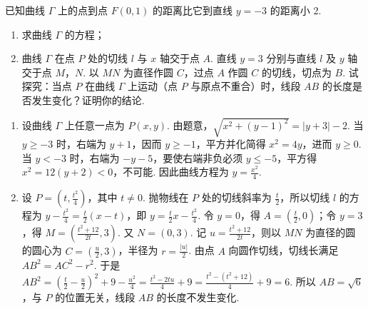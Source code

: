\begin{problem}
已知曲线 \(\Gamma\) 上的点到点 \(F(0,1)\) 的距离比它到直线 \(y = -3\) 的距离小 2.

\begin{enumerate}
\item 求曲线 \(\Gamma\) 的方程；
\item 曲线 \(\Gamma\) 在点 \(P\) 处的切线 \(l\) 与 \(x\) 轴交于点 \(A\). 直线 \(y = 3\) 分别与直线 \(l\) 及 \(y\) 轴交于点 \(M\)，\(N\). 以 \(MN\) 为直径作圆 \(C\)，过点 \(A\) 作圆 \(C\) 的切线，切点为 \(B\). 试探究：当点 \(P\) 在曲线 \(\Gamma\) 上运动（点 \(P\) 与原点不重合）时，线段 \(AB\) 的长度是否发生变化？证明你的结论.
\end{enumerate}

\begin{solution}
\begin{enumerate}
\item 设曲线 \(\Gamma\) 上任意一点为 \(P(x,y)\). 由题意，\(\sqrt{x^2+(y-1)^2}=|y+3|-2\). 当 \(y\geqslant-3\) 时，右端为 \(y+1\)，因而 \(y\geqslant-1\)，平方并化简得 \(x^2=4y\)，进而 \(y\geqslant0\). 当 \(y<-3\) 时，右端为 \(-y-5\)，要使右端非负必须 \(y\leqslant-5\)，平方得 \(x^2=12(y+2)<0\)，不可能. 因此曲线方程为 \(y=\frac{x^2}{4}\).
\item 设 \(P=\left(t,\frac{t^2}{4}\right)\)，其中 \(t\neq0\). 抛物线在 \(P\) 处的切线斜率为 \(\frac t2\)，所以切线 \(l\) 的方程为 \(y-\frac{t^2}{4}=\frac t2(x-t)\)，即 \(y=\frac t2x-\frac{t^2}{4}\). 令 \(y=0\)，得 \(A=\left(\frac t2,0\right)\)；令 \(y=3\)，得 \(M=\left(\frac{t^2+12}{2t},3\right)\). 又 \(N=(0,3)\). 记 \(u=\frac{t^2+12}{2t}\)，则以 \(MN\) 为直径的圆的圆心为 \(C=\left(\frac u2,3\right)\)，半径为 \(r=\frac{|u|}{2}\). 由点 \(A\) 向圆作切线，切线长满足 \(AB^2=AC^2-r^2\). 于是 \(AB^2=\left(\frac t2-\frac u2\right)^2+9-\frac{u^2}{4}=\frac{t^2-2tu}{4}+9=\frac{t^2-(t^2+12)}4+9=6\). 所以 \(AB=\sqrt6\)，与 \(P\) 的位置无关，线段 \(AB\) 的长度不发生变化.
\end{enumerate}
\end{solution}
\end{problem}

